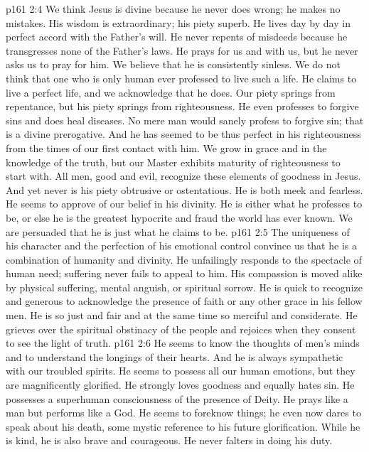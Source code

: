 \vs p161 2:4 \bibnobreakspace We think Jesus is divine because he never does wrong; he makes no mistakes. His wisdom is extraordinary; his piety superb. He lives day by day in perfect accord with the Father’s will. He never repents of misdeeds because he transgresses none of the Father’s laws. He prays for us and with us, but he never asks us to pray for him. We believe that he is consistently sinless. We do not think that one who is only human ever professed to live such a life. He claims to live a perfect life, and we acknowledge that he does. Our piety springs from repentance, but his piety springs from righteousness. He even professes to forgive sins and does heal diseases. No mere man would sanely profess to forgive sin; that is a divine prerogative. And he has seemed to be thus perfect in his righteousness from the times of our first contact with him. We grow in grace and in the knowledge of the truth, but our Master exhibits maturity of righteousness to start with. All men, good and evil, recognize these elements of goodness in Jesus. And yet never is his piety obtrusive or ostentatious. He is both meek and fearless. He seems to approve of our belief in his divinity. He is either what he professes to be, or else he is the greatest hypocrite and fraud the world has ever known. We are persuaded that he is just what he claims to be.
\vs p161 2:5 \bibnobreakspace The uniqueness of his character and the perfection of his emotional control convince us that he is a combination of humanity and divinity. He unfailingly responds to the spectacle of human need; suffering never fails to appeal to him. His compassion is moved alike by physical suffering, mental anguish, or spiritual sorrow. He is quick to recognize and generous to acknowledge the presence of faith or any other grace in his fellow men. He is so just and fair and at the same time so merciful and considerate. He grieves over the spiritual obstinacy of the people and rejoices when they consent to see the light of truth.
\vs p161 2:6 \bibnobreakspace He seems to know the thoughts of men’s minds and to understand the longings of their hearts. And he is always sympathetic with our troubled spirits. He seems to possess all our human emotions, but they are magnificently glorified. He strongly loves goodness and equally hates sin. He possesses a superhuman consciousness of the presence of Deity. He prays like a man but performs like a God. He seems to foreknow things; he even now dares to speak about his death, some mystic reference to his future glorification. While he is kind, he is also brave and courageous. He never falters in doing his duty.
